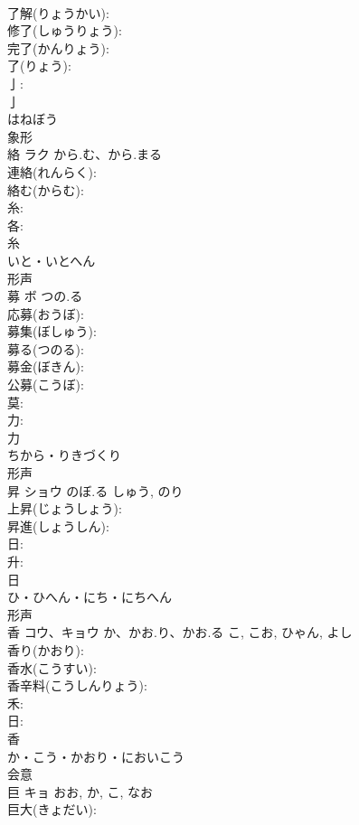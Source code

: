 \documentclass[8pt]{extreport}
\begin{document}
\begin{CJK}{UTF8}{min}
\\	了解(りょうかい): 
\\	修了(しゅうりょう): 
\\	完了(かんりょう): 
\\	了(りょう): 
\\	亅: 
\\	亅	
\\	はねぼう	
\\	象形 
\\	絡	ラク	から.む、から.まる		
\\	連絡(れんらく): 
\\	絡む(からむ): 
\\	糸: 
\\	各: 
\\	糸	
\\	いと・いとへん	
\\	形声 
\\	募	ボ	つの.る		
\\	応募(おうぼ): 
\\	募集(ぼしゅう): 
\\	募る(つのる): 
\\	募金(ぼきん): 
\\	公募(こうぼ): 
\\	莫: 
\\	力: 
\\	力	
\\	ちから・りきづくり	
\\	形声 
\\	昇	ショウ	のぼ.る	しゅう, のり	
\\	上昇(じょうしょう): 
\\	昇進(しょうしん): 
\\	日: 
\\	升: 
\\	日	
\\	ひ・ひへん・にち・にちへん	
\\	形声 
\\	香	コウ、キョウ	か、かお.り、かお.る	こ, こお, ひゃん, よし	
\\	香り(かおり): 
\\	香水(こうすい): 
\\	香辛料(こうしんりょう): 
\\	禾: 
\\	日: 
\\	香	
\\	か・こう・かおり・においこう	
\\	会意 
\\	巨	キョ		おお, か, こ, なお	
\\	巨大(きょだい): 

\end{CJK}
\end{document}

